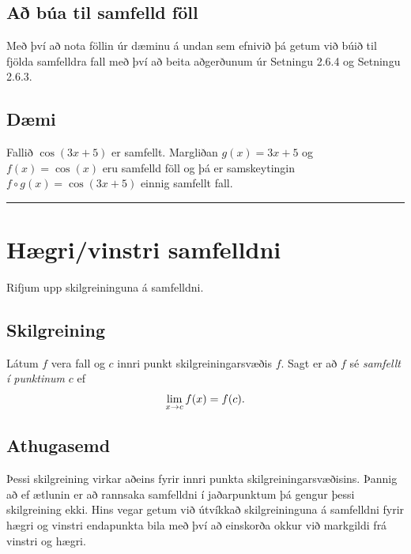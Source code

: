 \documentclass[a4paper,10pt,icelandic]{sphinxmanual}
\begin{document}
\subsection{Að búa til samfelld föll}
\label{kafli02:a-bua-til-samfelld-foll}
Með því að nota föllin úr dæminu á undan sem efnivið þá getum við búið
til fjölda samfelldra fall með því að beita aðgerðunum úr Setningu 2.6.4
og Setningu 2.6.3.


\subsection{Dæmi}
\label{kafli02:id14}\label{kafli02:index-10}
Fallið \(\cos(3x+5)\) er samfellt. Margliðan \(g(x) =3x+5\) og
\(f(x) = \cos(x)\) eru samfelld föll og þá er samskeytingin
\(f\circ g(x) = \cos(3x+5)\) einnig samfellt fall.


\bigskip\hrule{}\bigskip



\section{Hægri/vinstri samfelldni}
\label{kafli02:haegri-vinstri-samfelldni}
Rifjum upp skilgreininguna á samfelldni.


\subsection{Skilgreining}
\label{kafli02:skilgreining}
Látum \(f\) vera fall og \(c\) innri punkt skilgreiningarsvæðis
\(f\). Sagt er að \(f\) sé \emph{samfellt í punktinum} \(c\) ef
\begin{gather}
\begin{split}\lim_{x\rightarrow c}f(x)=f(c).\end{split}\notag
\end{gather}

\subsection{Athugasemd}
\label{kafli02:athugasemd}
Þessi skilgreining virkar aðeins fyrir innri punkta
skilgreiningarsvæðisins. Þannig að ef ætlunin er að rannsaka samfelldni
í jaðarpunktum þá gengur þessi skilgreining ekki. Hins vegar getum við
útvíkkað skilgreininguna á samfelldni fyrir hægri og vinstri endapunkta
bila með því að einskorða okkur við markgildi frá vinstri og hægri.
\end{document}
